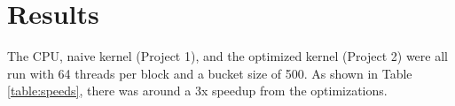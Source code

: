 \section{Results}
\hspace{\parindent}The CPU, naive kernel (Project 1), and the optimized kernel (Project 2) were all run with 64 threads per block and a bucket size of 500. As shown in Table \ref{table:speeds}, there was around a 3x speedup from the optimizations.  